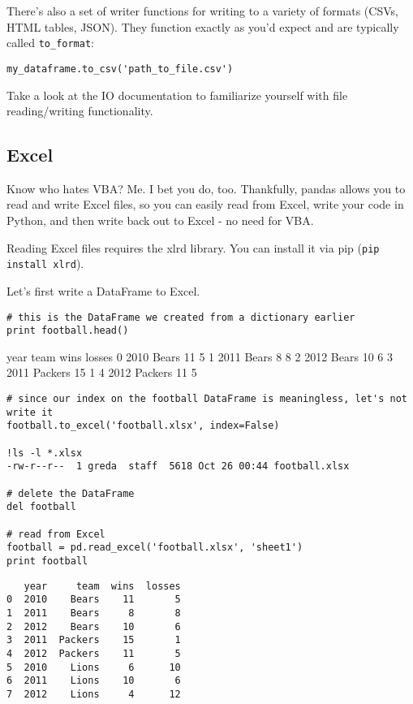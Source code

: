 There's also a set of writer functions for writing to a variety of formats (CSVs, HTML tables, JSON). They function exactly as you'd expect and are typically called \texttt{to\_format}:
\begin{framed}
\begin{verbatim}
my_dataframe.to_csv('path_to_file.csv')
\end{verbatim}
\end{framed}
Take a look at the IO documentation to familiarize yourself with file reading/writing functionality.
\subsection{Excel}

Know who hates VBA? Me. I bet you do, too. Thankfully, pandas allows you to read and write Excel files, so you can easily read from Excel, write your code in Python, and then write back out to Excel - no need for VBA.

Reading Excel files requires the xlrd library. You can install it via pip (\texttt{pip install xlrd}).

Let's first write a DataFrame to Excel.

\begin{framed}
\begin{verbatim}
# this is the DataFrame we created from a dictionary earlier
print football.head()
\end{verbatim}
\end{framed}
   year     team  wins  losses
0  2010    Bears    11       5
1  2011    Bears     8       8
2  2012    Bears    10       6
3  2011  Packers    15       1
4  2012  Packers    11       5

\begin{framed}
\begin{verbatim}
# since our index on the football DataFrame is meaningless, let's not write it
football.to_excel('football.xlsx', index=False)

!ls -l *.xlsx
-rw-r--r--  1 greda  staff  5618 Oct 26 00:44 football.xlsx

# delete the DataFrame
del football

# read from Excel
football = pd.read_excel('football.xlsx', 'sheet1')
print football
\end{verbatim}
\end{framed}
\begin{verbatim}
   year     team  wins  losses
0  2010    Bears    11       5
1  2011    Bears     8       8
2  2012    Bears    10       6
3  2011  Packers    15       1
4  2012  Packers    11       5
5  2010    Lions     6      10
6  2011    Lions    10       6
7  2012    Lions     4      12
\end{verbatim}


